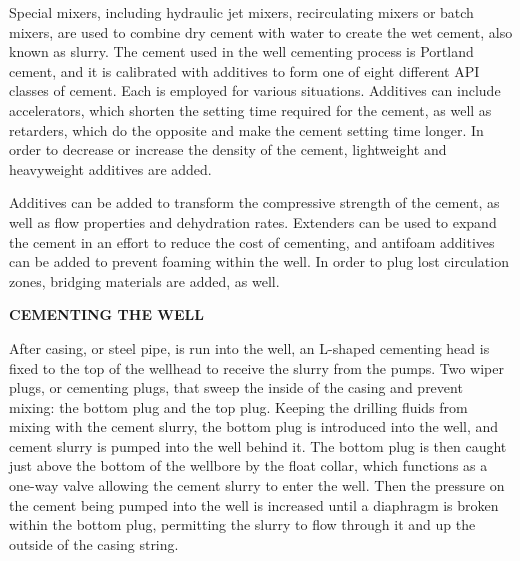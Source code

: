 Special mixers, including hydraulic jet mixers, recirculating mixers or batch mixers,
are used to combine dry cement with water to create the wet cement, also known as slurry. 
The cement used in the well cementing process is Portland cement, and it is calibrated 
with additives to form one of eight different API classes of cement. Each is employed for various situations.
Additives can include accelerators, which shorten the setting time required for the cement,
as well as retarders, which do the opposite and make the cement setting time longer.
In order to decrease or increase the density of the cement, lightweight and heavyweight additives are added.

\vspace{1em}

Additives can be added to transform the compressive strength of the cement,
as well as flow properties and dehydration rates. Extenders can be used to 
expand the cement in an effort to reduce the cost of cementing, and antifoam additives
can be added to prevent foaming within the well. In order to plug lost circulation zones, 
bridging materials are added, as well.

\vspace{1em}

\textbf{CEMENTING THE WELL}

\vspace{1em}

After casing, or steel pipe, is run into the well, an L-shaped cementing 
head is fixed to the top of the wellhead to receive the slurry from the pumps. 
Two wiper plugs, or cementing plugs, that sweep the
inside of the casing and prevent mixing: the bottom plug and the top plug.
Keeping the drilling fluids from mixing with the cement slurry, 
the bottom plug is introduced into the well, and cement slurry is pumped into the well behind it. 
The bottom plug is then caught just above the bottom of the wellbore by the float collar, 
which functions as a one-way valve allowing the cement slurry to enter the well.
Then the pressure on the cement being pumped into the well is increased until a diaphragm is broken within the bottom plug,
 permitting the slurry to flow through it and up the outside of the casing string.


\vspace{1em}



